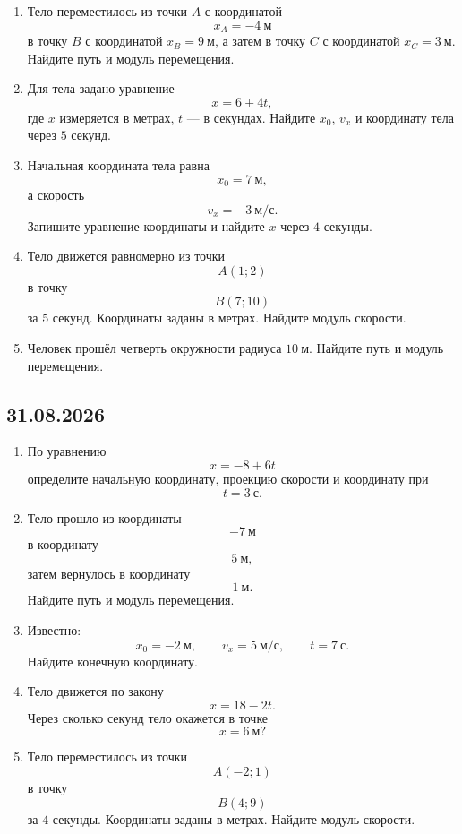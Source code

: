\documentclass[a4paper,12pt]{article}
\begin{document}
\begin{enumerate}[label=\textbf{\arabic*)}]
  \item Тело переместилось из точки \(A\) с координатой
  \[
  x_A=-4~\text{м}
  \]
  в точку \(B\) с координатой \(x_B=9~\text{м}\), а затем в точку \(C\) с координатой \(x_C=3~\text{м}\).
  Найдите путь и модуль перемещения.

  \item Для тела задано уравнение
  \[
  x=6+4t,
  \]
  где \(x\) измеряется в метрах, \(t\) --- в секундах.
  Найдите \(x_0\), \(v_x\) и координату тела через \(5\) секунд.

  \item Начальная координата тела равна
  \[
  x_0=7~\text{м},
  \]
  а скорость
  \[
  v_x=-3~\text{м/с}.
  \]
  Запишите уравнение координаты и найдите \(x\) через \(4\) секунды.

  \item Тело движется равномерно из точки
  \[
  A(1;2)
  \]
  в точку
  \[
  B(7;10)
  \]
  за \(5\) секунд. Координаты заданы в метрах.
  Найдите модуль скорости.

  \item Человек прошёл четверть окружности радиуса \(10~\text{м}\).
  Найдите путь и модуль перемещения.
\end{enumerate}

\subsection*{31.08.2026}

\begin{enumerate}[label=\textbf{\arabic*)}]
  \item По уравнению
  \[
  x=-8+6t
  \]
  определите начальную координату, проекцию скорости и координату при
  \[
  t=3~\text{с}.
  \]

  \item Тело прошло из координаты
  \[
  -7~\text{м}
  \]
  в координату
  \[
  5~\text{м},
  \]
  затем вернулось в координату
  \[
  1~\text{м}.
  \]
  Найдите путь и модуль перемещения.

  \item Известно:
  \[
  x_0=-2~\text{м},\qquad
  v_x=5~\text{м/с},\qquad
  t=7~\text{с}.
  \]
  Найдите конечную координату.

  \item Тело движется по закону
  \[
  x=18-2t.
  \]
  Через сколько секунд тело окажется в точке
  \[
  x=6~\text{м}?
  \]

  \item Тело переместилось из точки
  \[
  A(-2;1)
  \]
  в точку
  \[
  B(4;9)
  \]
  за \(4\) секунды. Координаты заданы в метрах.
  Найдите модуль скорости.
\end{enumerate}
\end{document}
